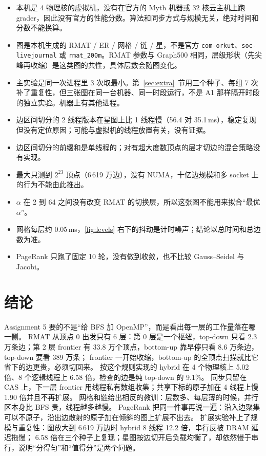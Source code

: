 \documentclass[11pt,a4paper]{ctexart}
\begin{document}
\begin{caveatbox}
\begin{itemize}
\item 本机是 4 物理核的虚拟机，没有在官方的 Myth 机器或 32 核云主机上跑 grader，因此没有官方的性能分数。算法和同步方式与规模无关，绝对时间和分数不能换算。
\item 图是本机生成的 RMAT / ER / 网格 / 链 / 星，不是官方 \texttt{com-orkut}、\texttt{soc-livejournal} 或 \texttt{rmat\_200m}。RMAT 参数与 Graph500 相同，层级形状（先尖峰再收缩）是这类图的共性，具体层数会随图变化。
\item 主实验是同一次进程里 3 次取最小。第~\ref{sec:extra}~节用三个种子、每组 7 次补了重复性，但三张图在同一台机器、同一时段运行，不是 A1 那样隔开时段的独立实验。机器上有其他进程。
\item 边区间切分的 2 线程版本在星图上比 1 线程慢（56.4 对 35.1\,ms），稳定复现但没有定位原因；可能与虚拟机的线程放置有关，没有证据。
\item 边区间切分的前缀和是单线程的；对有超大度数顶点的层才切边的混合策略没有实现。
\item 最大只测到 $2^{23}$ 顶点（6\,619 万边），没有 NUMA，十亿边规模和多 socket 上的行为不能由此推出。
\item $\alpha$ 在 2 到 64 之间没有改变 RMAT 的切换层，所以这张图不能用来拟合``最优 $\alpha$''。
\item 网格每层约 0.05\,ms，\cref{fig:levels} 右下的抖动是计时噪声；结论以总时间和总边数为准。
\item PageRank 只跑了固定 10 轮，没有做到收敛，也不比较 Gauss--Seidel 与 Jacobi。
\end{itemize}
\end{caveatbox}

\section{结论}

Assignment 5 要的不是``给 BFS 加 OpenMP''，而是看出每一层的工作量落在哪一侧。
RMAT 从顶点 0 出发只有 6 层：第 0 层是一个枢纽，top-down 只看 2.3 万条边；第 2 层 frontier 有 33.8 万个顶点，bottom-up 靠早停只看 8.6 万条边，top-down 要看 389 万条；
frontier 一开始收缩，bottom-up 的全顶点扫描就比它省下的边更贵，必须切回来。
按这个规则实现的 hybrid 在 4 个物理核上 5.02 倍、8 个逻辑线程上 6.58 倍，检查的边是纯 top-down 的 9.1\%。
同步只留在 CAS 上，下一层 frontier 用线程私有数组收集；共享下标的原子加在 4 线程上慢 1.90 倍并且不再扩展。
网格和链给出相反的教训：层数多、每层薄的时候，并行区本身比 BFS 贵，线程越多越慢。
PageRank 把同一件事再说一遍：沿入边聚集可以不原子，沿出边散射的原子加在倾斜的图上扩展不出去。
扩展实验补上了规模与重复性：图放大到 6\,619 万边时 hybrid 8 线程 12.2 倍，串行反被 DRAM 延迟拖慢；
6.58 倍在三个种子上复现；星图按边切开后负载均衡了，却依然慢于串行，说明``分得匀''和``值得分''是两个问题。
\end{document}
